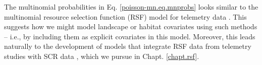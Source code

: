 The multinomial probabilities in Eq. \ref{poisson-mn.eq.mnprobs}
looks similar to the 
multinomial resource selection function (RSF) model for telemetry data
\citep{manly_etal:2002, lele_keim:2006}.  This suggests how we might
model landscape or habitat covariates using such methods -- i.e., by
including them as explicit covariates in this model. Moreover, this
leads naturally to the development of models that integrate RSF data
from telemetry studies with SCR data \citep{royle_chandler:2012},
which we pursue in Chapt. \ref{chapt.rsf}.




